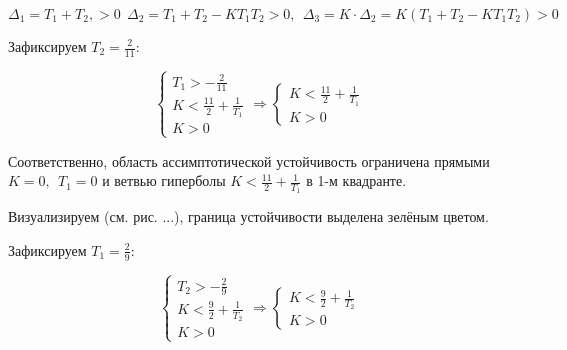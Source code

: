 \begin{par}
$$\Delta_1 =T_1 +T_2 ,>0~~\Delta_2 =T_1 +T_2 -KT_1 T_2 >0,~~\Delta_3 =K\cdot \Delta_2 =K(T_1 +T_2 -KT_1 T_2 )>0$$    
\end{par}

\begin{par}
\begin{flushleft}
Зафиксируем $T_2 =\frac{2}{11}$:
\end{flushleft}
\end{par}

\begin{par}
$$\left\lbrace \begin{array}{c}
T_1 >-\frac{2}{11}\\
K<\frac{11}{2}+\frac{1}{T_1 }\\
K>0
\end{array}\right.\Rightarrow \left\lbrace \begin{array}{c}
K<\frac{11}{2}+\frac{1}{T_1 }\\
K>0
\end{array}\right.$$
\end{par}

\begin{par}
\begin{flushleft}
Соответственно, область ассимптотической устойчивость ограничена прямыми $K=0,~~T_1 =0$ и ветвью гиперболы $K<\frac{11}{2}+\frac{1}{T_1 }$ в 1-м квадранте.
\end{flushleft}
\end{par}

\begin{par}
\begin{flushleft}
Визуализируем (см. рис. ...), граница устойчивости выделена зелёным цветом.
\end{flushleft}
\end{par}

\begin{par}
\begin{flushleft}
Зафиксируем $T_1 =\frac{2}{9}$:
\end{flushleft}
\end{par}

\begin{par}
$$\left\lbrace \begin{array}{c}
T_2 >-\frac{2}{9}\\
K<\frac{9}{2}+\frac{1}{T_2 }\\
K>0
\end{array}\right.\Rightarrow \left\lbrace \begin{array}{c}
K<\frac{9}{2}+\frac{1}{T_2 }\\
K>0
\end{array}\right.$$
\end{par}

